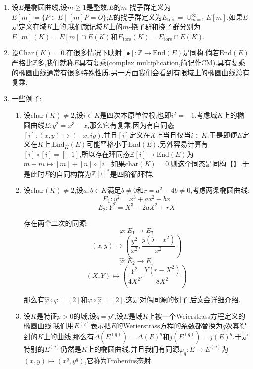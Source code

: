 \begin{enumerate}
\begin{proof}
		上一条说明了$\mathrm{End}(E)$是特征零的.假设有$E$的自同态$\varphi,\psi$满足$\varphi\circ\psi=[0]$,取次数得到$\deg\varphi\deg\psi=0$,所以$\deg\varphi=0$或者$\deg\psi=0$,于是$\varphi=[0]$或者$\psi=[0]$.
	\end{proof}
	\item 设$E$是椭圆曲线,设$m\ge1$是整数,$E$的$m$-挠子群定义为$E[m]=\{P\in E\mid [m]P=O\}$;$E$的挠子群定义为$E_{\mathrm{tors}}=\cup_{m=1}^{\infty}E[m]$.如果$E$是定义在域$K$上的,我们就记域$K$上的$m$-挠子群和挠子群分别为$E[m](K)=E[m]\cap E(K)$和$E_{\mathrm{tors}}(K)=E_{\mathrm{tors}}\cap E(K)$.
	\item 设$\mathrm{Char}(K)=0$.在很多情况下映射$[\bullet]:\mathbb{Z}\to\mathrm{End}(E)$是同构.倘若$\mathrm{End}(E)$严格比$\mathbb{Z}$多,我们就称$E$具有复乘(complex multiplication,简记作CM).具有复乘的椭圆曲线通常有很多特殊性质.另一方面我们会看到有限域上的椭圆曲线总有复乘.
	\item 一些例子:
	\begin{enumerate}
		\item 设$\mathrm{char}(K)\not=2$,设$i\in\overline{K}$是四次本原单位根,也即$i^2=-1$.考虑域$K$上的椭圆曲线$E:y^2=x^3-x$,那么它有复乘,因为有自同态$[i]:(x,y)\mapsto(-x,iy)$.并且$[i]$定义在$K$上当且仅当$i\in K$.于是即便$E$定义在$K$上,$\mathrm{End}_K(E)$可能严格小于$\mathrm{End}(E)$.另外容易计算有$[i]\circ[i]=[-1]$,所以存在环同态$\mathbb{Z}[i]\to\mathrm{End}(E)$为$m+ni\mapsto[m]+[n]\circ[i]$.如果$\mathrm{char}(K)=0$,则这个同态是同构【】.于是此时$E$的自同构群为$\mathbb{Z}[i]^*$是四阶循环群.
		\item 设$\mathrm{char}(K)\not=2$,设$a,b\in K$满足$b\not=0$和$r=a^2-4b\not=0$,考虑两条椭圆曲线:
		$$E_1:y^2=x^3+ax^2+bx$$
		$$E_2:Y^2=X^3-2aX^2+rX$$
		
		存在两个二次的同源:
		$$\varphi:E_1\to E_2$$
		$$(x,y)\mapsto\left(\frac{y^2}{x^2},\frac{y(b-x^2)}{x^2}\right)$$
		$$\widehat{\varphi}:E_2\to E_1$$
		$$(X,Y)\mapsto\left(\frac{Y^2}{4X^2},\frac{Y(r-X^2)}{8X^2}\right)$$
		
		那么有$\widehat{\varphi}\circ\varphi=[2]$和$\varphi\circ\widehat{\varphi}=[2]$.这是对偶同源的例子,后文会详细介绍.
		\item 设$K$是特征$p>0$的域,设$q=p^r$,设$E$是域$K$上被一个Weierstrass方程定义的椭圆曲线.我们用$E^{(q)}$表示把$E$的Werierstrass方程的系数都替换为$q$次幂得到的$K$上的曲线,那么有$\Delta(E^{(q)})=\Delta(E)^q$和$j(E^{(q)})=j(E)^q$.于是特别的$E^{(q)}$仍然是$K$上的椭圆曲线.并且我们有同源$\varphi_q:E\to E^{(q)}$为$(x,y)\mapsto(x^q,y^q)$,它称为Frobenius态射.
		
		\qquad
		

\end{enumerate}
\end{enumerate}
